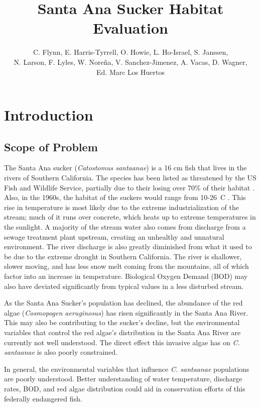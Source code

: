 \documentclass{article}\usepackage[]{graphicx}\usepackage[]{color}
\title{Santa Ana Sucker Habitat Evaluation}
\author{C. Flynn, E. Harris-Tyrrell, O. Howie, L. Ho-Israel, S. Janssen, \\N. Larson, F. Lyles, W. Nore\~na, V. Sanchez-Jimenez, A. Vacas, D. Wagner,\\ Ed. Marc Los Huertos}
\begin{document}
\maketitle

\newpage
\tableofcontents
\newpage

\section{Introduction}

\subsection{Scope of Problem}

The Santa Ana sucker (\emph{Catostomus santaanae}) is a 16 cm fish that lives in the rivers of Southern California. The species has been listed as threatened by the US Fish and Wildlife Service, partially due to their losing over 70\% of their habitat \citep{obrien2011status, usfishandwildlifeservice14}. Also, in the 1960s, the habitat of the suckers would range from 10-26\textdegree~C \citep{greenfield70}.  This rise in temperature is most likely due to the extreme industrialization of the stream; much of it runs over concrete, which heats up to extreme temperatures in the sunlight.  A majority of the stream water also comes from discharge from a sewage treatment plant upstream, creating an unhealthy and unnatural environment.  The river discharge is also greatly diminished from what it used to be due to the extreme drought in Southern California.  The river is shallower, slower moving, and has less snow melt coming from the mountains, all of which factor into an increase in temperature. Biological Oxygen Demand (BOD) may also have deviated significantly from typical values in a less disturbed stream. 

As the Santa Ana Sucker's population has declined, the abundance of the red algae (\emph{Cosmopogen aeruginosus}) has risen significantly in the Santa Ana River. This may also be contributing to the sucker's decline, but the environmental variables that control the red algae's distribution in the Santa Ana River are currently not well understood. The direct effect this invasive algae has on \emph{C. santaanae} is also poorly constrained. 

In general, the environmental variables that influence \emph{C. santaanae} populations are poorly understood. Better understanding of water temperature, discharge rates, BOD, and red algae distribution could aid in conservation efforts of this federally endangered fish. 
\end{document}
